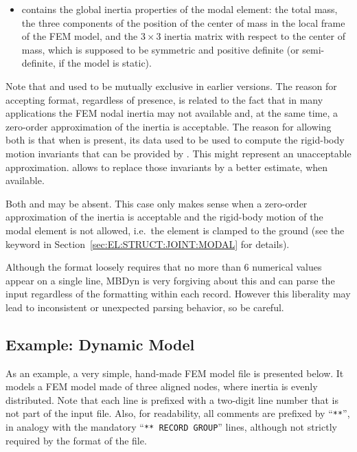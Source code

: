 \begin{itemize}
\item {} contains the global inertia properties
of the modal element: the total mass, the three components 
of the position of the center of mass in the local frame
of the FEM model, and the $3\times{3}$ inertia matrix
with respect to the center of mass, which is supposed
to be symmetric and positive definite (or semi-definite,
if the model is static).
\end{itemize}

Note that  and 
used to be mutually exclusive in earlier versions.
The reason for accepting  format,
regardless of  presence, is related
to the fact that in many applications the FEM nodal inertia
may not available and, at the same time, a zero-order approximation
of the inertia is acceptable.
The reason for allowing both is that when 
is present, its data used to be used to compute the rigid-body
motion invariants that can be provided by .
This might represent an unacceptable approximation.
 allows to replace those invariants
by a better estimate, when available.

Both  and  may be absent.
This case only makes sense when a zero-order approximation
of the inertia is acceptable and the rigid-body motion
of the modal element is not allowed, i.e.\ the element is clamped
to the ground (see the keyword 
in Section~\ref{sec:EL:STRUCT:JOINT:MODAL} for details).


Although the format loosely requires that no more than 6 numerical values 
appear on a single line, MBDyn is very forgiving about this and can parse
the input regardless of the formatting within each record.
However this liberality may lead to inconsistent or unexpected parsing
behavior, so be careful.



\subsection{Example: Dynamic Model}
\label{sec:APP:EL:STRUCT:JOINT:MODAL:DYNAMIC-MODEL}
As an example, a very simple, hand-made FEM model file is presented below.
It models a FEM model made of three aligned nodes, where inertia 
is evenly distributed.
Note that each line is prefixed with a two-digit line number 
that is not part of the input file.
Also, for readability, all comments are prefixed by ``\texttt{**}'', in analogy
with the mandatory ``\texttt{** RECORD GROUP}'' lines, although not strictly
required by the format of the file.

